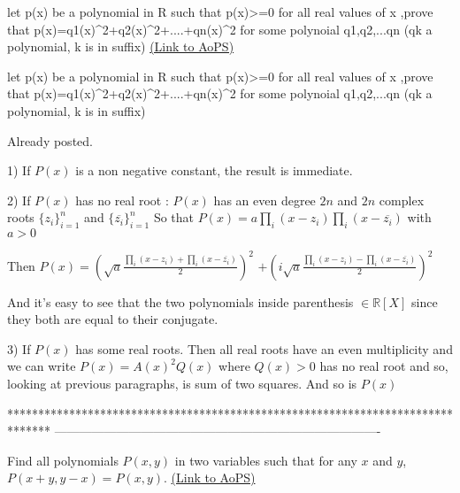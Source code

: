 \begin{problem}
	let p(x) be a polynomial in R such that p(x)>=0 for all real values of x ,prove that 
 p(x)=q1(x)^2+q2(x)^2+....+qn(x)^2
  for some polynoial q1,q2,...qn (qk a polynomial, k is in suffix)
	\flushright \href{https://artofproblemsolving.com/community/c6h478007}{(Link to AoPS)}
\end{problem}



\begin{solution}
	\begin{tcolorbox}let p(x) be a polynomial in R such that p(x)>=0 for all real values of x ,prove that 
 p(x)=q1(x)^2+q2(x)^2+....+qn(x)^2
  for some polynoial q1,q2,...qn (qk a polynomial, k is in suffix)\end{tcolorbox}
Already posted.

1) If $P(x)$ is a non negative constant, the result is immediate.

2) If $P(x)$ has no real root :
 $P(x)$  has an even degree $2n$ and $2n$ complex roots $\{z_i\}_{i=1}^n$ and $\{\overline{z_i}\}_{i=1}^n$
So that $P(x)=a\prod_i(x-z_i)\prod_i(x-\overline{z_i})$ with $a>0$

Then $P(x)=\left(\sqrt a\frac{\prod_i(x-z_i)+\prod_i(x-\overline{z_i})}2\right)^2$ $+\left(i\sqrt a\frac{\prod_i(x-z_i)-\prod_i(x-\overline{z_i})}2\right)^2$

And it's easy to see that the two polynomials inside parenthesis $\in\mathbb R[X]$ since they both are equal to their conjugate.

3)  If $P(x)$ has some real roots.
Then all real roots have an even multiplicity and we can write $P(x)=A(x)^2Q(x)$ where $Q(x)>0$ has no real root and so, looking at previous paragraphs, is sum of two squares.
And so is $P(x)$
\end{solution}
*******************************************************************************
-------------------------------------------------------------------------------

\begin{problem}
	Find all polynomials $P(x,y)$ in two variables such that for any $x$ and $y$, $P(x+y,y-x)=P(x,y)$.
	\flushright \href{https://artofproblemsolving.com/community/c6h478931}{(Link to AoPS)}
\end{problem}



